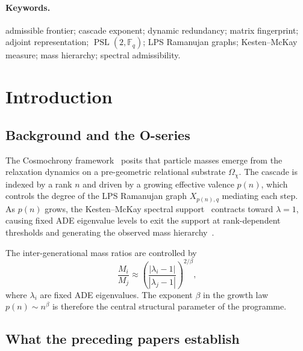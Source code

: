 \documentclass[11pt]{article}
\theoremstyle{definition}
\theoremstyle{remark}
\DeclareMathOperator{\PSL}{PSL}
\newcommand{\F}{\mathbb{F}}
\begin{document}
  \paragraph{Keywords.}
    admissible frontier; cascade exponent; dynamic redundancy; matrix fingerprint;
    adjoint representation; $\PSL(2, \F_q)$; LPS Ramanujan graphs; Kesten--McKay measure;
    mass hierarchy; spectral admissibility.

    \clearpage
    \tableofcontents

    \clearpage

  \section{Introduction}
  \label{sec:intro}

  \subsection{Background and the O-series}
    \label{ssec:background}

    The Cosmochrony framework~\cite{Cosmochrony} posits that particle masses emerge from the
    relaxation dynamics on a pre-geometric relational substrate $\Omega_\chi$.
    The cascade is indexed by a rank $n$ and driven by a growing effective valence $p(n)$,
    which controls the degree of the LPS Ramanujan graph $X_{p(n),q}$ mediating each step.
    As $p(n)$ grows, the Kesten--McKay spectral support~\cite{Kesten59,McKay81} contracts
    toward $\lambda = 1$, causing fixed ADE eigenvalue levels to exit the support at
    rank-dependent thresholds and generating the observed mass hierarchy~\cite{Beau2026a6,Beau2026a8}.

    The inter-generational mass ratios are controlled by
    \begin{equation}
      \label{eq:mass-ratio}
      \frac{M_i}{M_j} \approx
      \left( \frac{|\lambda_i - 1|}{|\lambda_j - 1|} \right)^{2/\beta},
    \end{equation}
    where $\lambda_i$ are fixed ADE eigenvalues.
    The exponent $\beta$ in the growth law $p(n) \sim n^\beta$ is therefore the central
    structural parameter of the programme.

  \subsection{What the preceding papers establish}
    \label{ssec:preceding}
\end{document}
